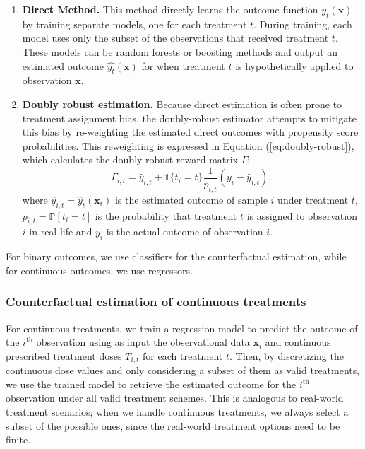 \documentclass[10pt]{article} %
\begin{document}
\begin{enumerate}
    \item \textbf{Direct Method.} This method directly learns the outcome function $y_{t}(\boldsymbol{x})$ by training separate models, one for each treatment $t$. During training, each model uses only the subset of the observations that received treatment $t$. These models can be random forests or boosting methods and output an estimated outcome $\hat{y_{t}}(\boldsymbol{x})$ for when treatment $t$ is hypothetically applied to observation $\boldsymbol{x}$. 

    \item \textbf{Doubly robust estimation.} Because direct estimation is often prone to treatment assignment bias, the doubly-robust estimator attempts to mitigate this bias by re-weighting the estimated direct outcomes with propensity score probabilities. This reweighting is expressed in Equation (\ref{eq:doubly-robust}), which calculates the doubly-robust reward matrix $\Gamma$:
    \begin{equation}\label{eq:doubly-robust}
        \Gamma_{i,t} = \hat{y}_{i,t} + \mathbb{1}\{t_{i}=t\} \frac{1}{p_{i,t}} (y_i-\hat{y}_{i,t}), 
    \end{equation}
    where $\hat{y}_{i,t} = \hat{y}_t(\boldsymbol{x}_i)$ is the estimated outcome of sample $i$ under treatment $t$, $p_{i,t} =  \mathbb{P}[t_i=t]$ is the probability that treatment $t$ is assigned to observation $i$ in real life and $y_i$ is the actual outcome of observation $i$. 
\end{enumerate}
For binary outcomes, we use classifiers for the counterfactual estimation, while for continuous outcomes, we use regressors. 

\subsubsection{Counterfactual estimation of continuous treatments}\label{subsubsec:counterfactual-estimation-continuous}

For continuous treatments, we train a regression model to predict the outcome of the $i^{\text{th}}$ observation using as input the observational data $\boldsymbol{x}_{i}$ and continuous prescribed treatment doses $T_{i,t}$ for each treatment $t$. Then, by discretizing the continuous dose values and only considering a subset of them as valid treatments, we use the trained model to retrieve the estimated outcome for the $i^{\text{th}}$ observation under all valid treatment schemes. This is analogous to real-world treatment scenarios; when we handle continuous treatments, we always select a subset of the possible ones, since the real-world treatment options need to be finite.
\end{document}
